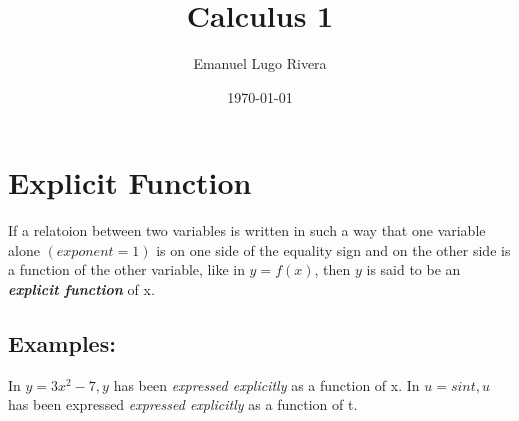 \documentclass[a4paper,12pt]{article}
\title{Calculus 1}
\author{Emanuel Lugo Rivera}
\date{\today}
\begin{document}
\section*{Explicit Function}
If a relatoion between two variables is written in such a way that one variable alone $(exponent = 1)$ is on one side of the equality sign
and on the other side is a function of the other variable, like in $y= f(x)$, then $y$ is said to be an \textbf{\textit{explicit function}} of x.

\subsection*{Examples:}
In $y = 3x^2 -7, y$ has been  \textit{expressed explicitly} as a function of x.
In $u = sin t, u$ has been expressed \textit{expressed explicitly} as a function of t.
\end{document}
